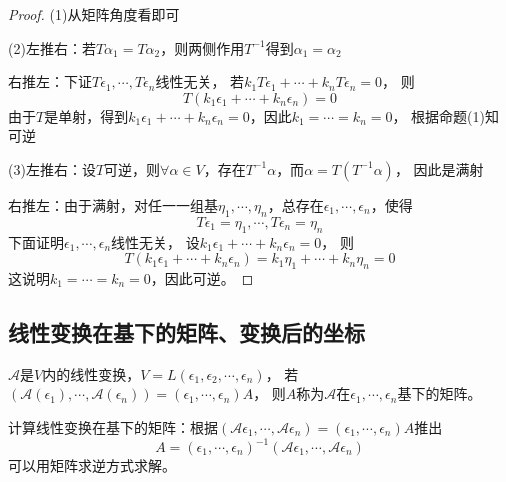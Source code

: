 \begin{proof}
  (1)从矩阵角度看即可

  (2)左推右：若$T\alpha_1 = T\alpha_2$，则两侧作用$T^{-1}$得到$\alpha_1 = \alpha_2$

  右推左：下证$T\epsilon_1,\cdots,T\epsilon_n$线性无关，
  若$k_1T\epsilon_1 + \cdots + k_nT\epsilon_n = 0$，
  则
  \begin{equation*}
    T(k_1\epsilon_1 + \cdots + k_n\epsilon_n) = 0
  \end{equation*}
  由于$T$是单射，得到$k_1\epsilon_1 + \cdots + k_n\epsilon_n = 0$，因此$k_1 = \cdots = k_n = 0$，
  根据命题(1)知可逆

  (3)左推右：设$T$可逆，则$\forall \alpha \in V$，存在$T^{-1}\alpha$，而$\alpha = T(T^{-1}\alpha)$，
  因此是满射

  右推左：由于满射，对任一一组基$\eta_1,\cdots,\eta_n$，总存在$\epsilon_1,\cdots,\epsilon_n$，使得
  \begin{equation*}
    T\epsilon_1 = \eta_1,\cdots,T\epsilon_n = \eta_n
  \end{equation*}
  下面证明$\epsilon_1,\cdots,\epsilon_n$线性无关，
  设$k_1\epsilon_1 + \cdots + k_n\epsilon_{n }= 0$，
  则
  \begin{equation*}
    T(k_1\epsilon_1 + \cdots + k_n\epsilon_n) = k_1\eta_1 + \cdots + k_n\eta_n = 0
  \end{equation*}
  这说明$k_1 = \cdots = k_n = 0$，因此可逆。
\end{proof}


\subsection{线性变换在基下的矩阵、变换后的坐标}


\begin{definition}[线性变换的矩阵]
  $\mathcal A$是$V$内的线性变换，$V = L(\epsilon_1,\epsilon_2,\cdots,\epsilon_n)$，
  若$(\mathcal{A}(\epsilon_1),\cdots,\mathcal{A}(\epsilon_n)) = (\epsilon_1,\cdots,\epsilon_n)A$，
  则$A$称为$\mathcal{A}$在$\epsilon_1,\cdots,\epsilon_n$基下的矩阵。
\end{definition}

\begin{note}
  计算线性变换在基下的矩阵：根据$(\mathcal{A}\epsilon_1,\cdots,\mathcal{A} \epsilon_n) =  (\epsilon_1,\cdots,\epsilon_n)A$推出
  \begin{equation*}
    A = (\epsilon_1,\cdots,\epsilon_n)^{-1} (\mathcal{A} \epsilon_1,\cdots,\mathcal{A}\epsilon_n)
  \end{equation*}
  可以用矩阵求逆方式求解。
\end{note}


